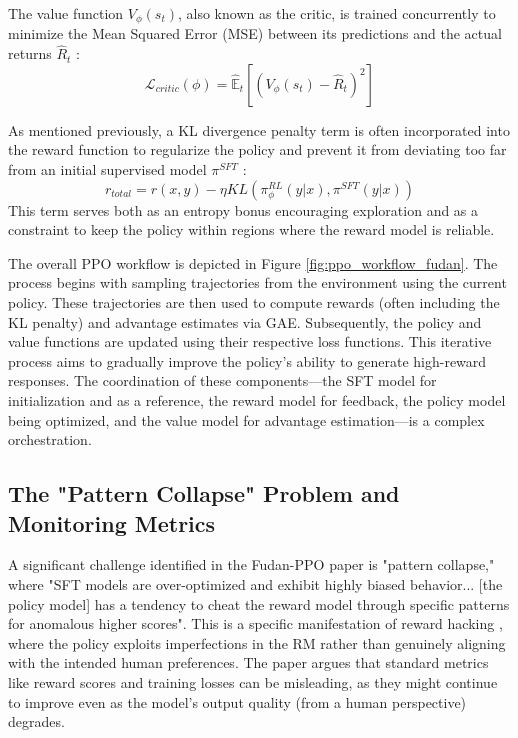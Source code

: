 \documentclass[10pt,journal,compsoc]{IEEEtran} %
\begin{document}
The value function $V_\phi(s_t)$, also known as the critic, is trained concurrently to minimize the Mean Squared Error (MSE) between its predictions and the actual returns $\hat{R}_t$ \cite{Zheng2023PPO}:
$$ \mathcal{L}_{critic}(\phi) = \hat{\mathbb{E}}_{t} \left[ (V_\phi(s_t) - \hat{R}_t)^2 \right] $$

As mentioned previously, a KL divergence penalty term is often incorporated into the reward function to regularize the policy and prevent it from deviating too far from an initial supervised model $\pi^{SFT}$ \cite{Zheng2023PPO}:
$$ r_{total} = r(x,y) - \eta KL(\pi_\phi^{RL}(y|x),\pi^{SFT}(y|x)) $$
This term serves both as an entropy bonus encouraging exploration and as a constraint to keep the policy within regions where the reward model is reliable. \cite{Zheng2023PPO}

The overall PPO workflow is depicted in Figure \ref{fig:ppo_workflow_fudan}. The process begins with sampling trajectories from the environment using the current policy. These trajectories are then used to compute rewards (often including the KL penalty) and advantage estimates via GAE. Subsequently, the policy and value functions are updated using their respective loss functions. This iterative process aims to gradually improve the policy's ability to generate high-reward responses. The coordination of these components—the SFT model for initialization and as a reference, the reward model for feedback, the policy model being optimized, and the value model for advantage estimation—is a complex orchestration.


\subsection{The "Pattern Collapse" Problem and Monitoring Metrics}
A significant challenge identified in the Fudan-PPO paper is "pattern collapse," where "SFT models are over-optimized and exhibit highly biased behavior... [the policy model] has a tendency to cheat the reward model through specific patterns for anomalous higher scores". \cite{Zheng2023PPO} This is a specific manifestation of reward hacking \cite{Zhang2024EnergyLoss, Fu2024RewardShaping, ETHZurichRewardHackingProposal}, where the policy exploits imperfections in the RM rather than genuinely aligning with the intended human preferences. The paper argues that standard metrics like reward scores and training losses can be misleading, as they might continue to improve even as the model's output quality (from a human perspective) degrades. \cite{Zheng2023PPO}
\end{document}
